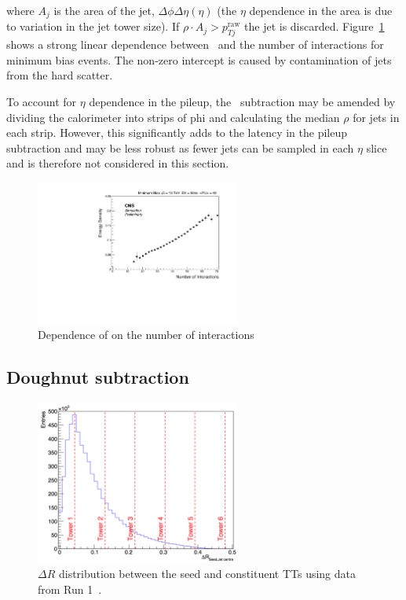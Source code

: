 where $A_j$ is the area of the jet, $\Delta\phi\Delta\eta(\eta)$ (the $\eta$ dependence in the area is due 
to variation in the jet tower size). If $\rho \cdot A_j > p_{Tj}^{\text{raw}}$ the jet is discarded. 
Figure~\ref{fig:medianNint} shows a strong linear dependence between \rhoG~and the number of interactions for
minimum bias events. The non-zero intercept is caused by contamination of jets from the hard scatter.

To account for $\eta$ dependence in the pileup, the \rhoG~subtraction may be amended by
dividing the calorimeter into strips of phi and calculating the median $\rho$ for jets in each 
strip. However, this significantly adds to the latency in the pileup subtraction and may 
be less robust as fewer jets can be sampled in each $\eta$ slice and 
is therefore not considered in this section.

\begin{figure}
\centering
    \includegraphics[width=0.6\textwidth]{./Figures/triggerUpgrade/median}
  \caption{Dependence of \rhoG on the number of interactions}
  \label{fig:medianNint}
\end{figure}  

\subsection{Doughnut subtraction}
\begin{figure}
\centering
    \includegraphics[width=0.6\textwidth]{./Figures/triggerUpgrade/deltaR2}
  \caption{$\Delta R$ distribution between the seed and constituent TTs using data from Run 1~\cite{mark-thesis}.}
  \label{fig:deltaR2}
\end{figure}  


